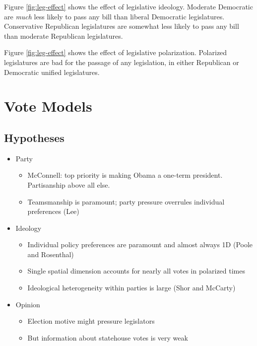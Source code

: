 \documentclass[
  oneside]{book}
\providecommand{\tightlist}{%
  \setlength{\itemsep}{0pt}\setlength{\parskip}{0pt}}
\begin{document}
Figure \ref{fig:leg-effect} shows the effect of legislative ideology. Moderate Democratic are \emph{much} less likely to pass any bill than liberal Democratic legislatures. Conservative Republican legislatures are somewhat less likely to pass any bill than moderate Republican legislatures.

Figure \ref{fig:leg-effect} shows the effect of legislative polarization. Polarized legislatures are bad for the passage of any legislation, in either Republican or Democratic unified legislatures.

\hypertarget{vote-models}{%
\chapter{Vote Models}\label{vote-models}}

\hypertarget{hypotheses-1}{%
\section{Hypotheses}\label{hypotheses-1}}

\begin{itemize}
\tightlist
\item
  Party

  \begin{itemize}
  \tightlist
  \item
    McConnell: top priority is making Obama a one-term president. Partisanship above all else.
  \item
    Teamsmanship is paramount; party pressure overrules individual preferences (Lee)
  \end{itemize}
\item
  Ideology

  \begin{itemize}
  \tightlist
  \item
    Individual policy preferences are paramount and almost always 1D (Poole and Rosenthal)
  \item
    Single spatial dimension accounts for nearly all votes in polarized times
  \item
    Ideological heterogeneity within parties is large (Shor and McCarty)
  \end{itemize}
\item
  Opinion

  \begin{itemize}
  \tightlist
  \item
    Election motive might pressure legislators
  \item
    But information about statehouse votes is very weak
  \end{itemize}
\end{itemize}
\end{document}
